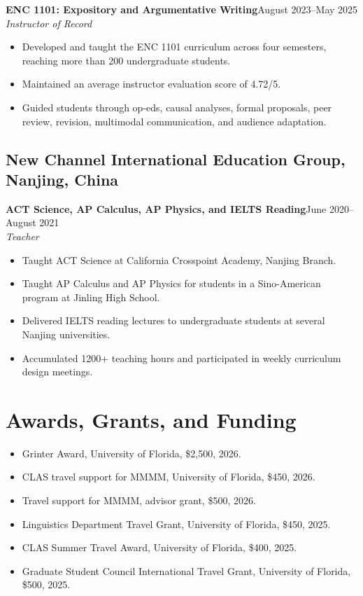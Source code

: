 \documentclass[11pt,letterpaper]{article}
\newcommand{\role}[3]{\textbf{#1}\hfill #2\\\textit{#3}\\}
\begin{document}
\role{ENC 1101: Expository and Argumentative Writing}{August 2023--May 2025}{Instructor of Record}
\begin{itemize}
\item Developed and taught the ENC 1101 curriculum across four semesters, reaching more than 200 undergraduate students.
\item Maintained an average instructor evaluation score of 4.72/5.
\item Guided students through op-eds, causal analyses, formal proposals, peer review, revision, multimodal communication, and audience adaptation.
\end{itemize}

\subsection*{New Channel International Education Group, Nanjing, China}
\role{ACT Science, AP Calculus, AP Physics, and IELTS Reading}{June 2020--August 2021}{Teacher}
\begin{itemize}
\item Taught ACT Science at California Crosspoint Academy, Nanjing Branch.
\item Taught AP Calculus and AP Physics for students in a Sino-American program at Jinling High School.
\item Delivered IELTS reading lectures to undergraduate students at several Nanjing universities.
\item Accumulated 1200+ teaching hours and participated in weekly curriculum design meetings.
\end{itemize}

\section*{Awards, Grants, and Funding}
\begin{itemize}
\item Grinter Award, University of Florida, \$2,500, 2026.
\item CLAS travel support for MMMM, University of Florida, \$450, 2026.
\item Travel support for MMMM, advisor grant, \$500, 2026.
\item Linguistics Department Travel Grant, University of Florida, \$450, 2025.
\item CLAS Summer Travel Award, University of Florida, \$400, 2025.
\item Graduate Student Council International Travel Grant, University of Florida, \$500, 2025.
\end{itemize}
\end{document}
